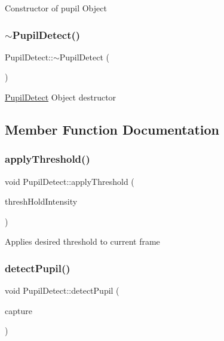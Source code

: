 Constructor of pupil Object \mbox{\label{class_pupil_detect_af97e965d47623069188ffdf793248077}} 
\subsubsection{\texorpdfstring{$\sim$\+Pupil\+Detect()}{~PupilDetect()}}
{\footnotesize\ttfamily Pupil\+Detect\+::$\sim$\+Pupil\+Detect (\begin{DoxyParamCaption}{ }\end{DoxyParamCaption})}

\mbox{\hyperlink{class_pupil_detect}{Pupil\+Detect}} Object destructor 

\subsection{Member Function Documentation}
\mbox{\label{class_pupil_detect_a0ee35bec8dee73602288be1e95ab7b22}} 
\subsubsection{\texorpdfstring{apply\+Threshold()}{applyThreshold()}}
{\footnotesize\ttfamily void Pupil\+Detect\+::apply\+Threshold (\begin{DoxyParamCaption}\item[{int}]{thresh\+Hold\+Intensity }\end{DoxyParamCaption})\hspace{0.3cm}{\ttfamily [private]}}

Applies desired threshold to current frame \mbox{\label{class_pupil_detect_a6c3419d438fde03cc460597257e05446}} 
\subsubsection{\texorpdfstring{detect\+Pupil()}{detectPupil()}}
{\footnotesize\ttfamily void Pupil\+Detect\+::detect\+Pupil (\begin{DoxyParamCaption}\item[{cv\+::\+Video\+Capture}]{capture }\end{DoxyParamCaption})}

